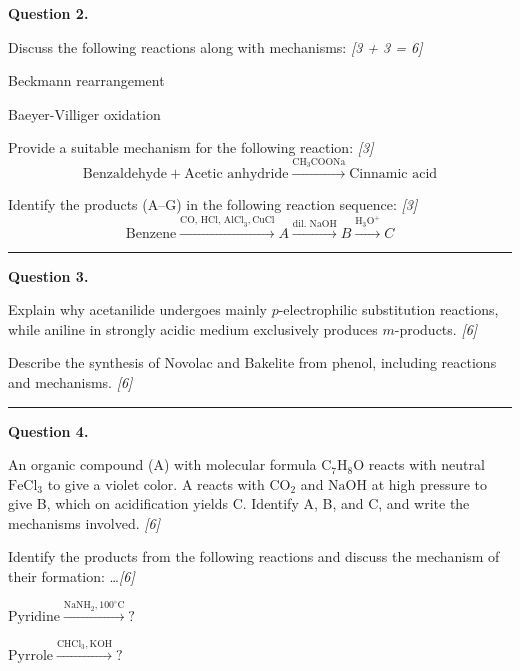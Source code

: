 \documentclass[11pt,a4paper]{article}
\newcommand{\pts}[1]{\hfill   \textit{[#1]}}
\begin{document}
\noindent   \textbf{Question 2.}

\begin{parts}
  \item Discuss the following reactions along with mechanisms: \pts{3 + 3 = 6}
  
\begin{parts}
    \item Beckmann rearrangement
    \item Baeyer-Villiger oxidation
  \end{parts}
  \item Provide a suitable mechanism for the following reaction: \pts{3}
    \[  \text{Benzaldehyde} +  \text{Acetic anhydride} \xrightarrow{ \text{CH}_3 \text{COONa}}  \text{Cinnamic acid} \]
  \item Identify the products (A--G) in the following reaction sequence: \pts{3}
    \[  \text{Benzene} \xrightarrow{ \text{CO, HCl, AlCl}_3,  \text{CuCl}} A \xrightarrow{ \text{dil. NaOH}} B \xrightarrow{ \text{H}_3 \text{O}^+} C \]
\end{parts}

\medskip\rule{\linewidth}{0.2pt}




\noindent   \textbf{Question 3.}

\begin{parts}
  \item Explain why acetanilide undergoes mainly $p$-electrophilic substitution reactions, while aniline in strongly acidic medium exclusively produces $m$-products. \pts{6}
  \item Describe the synthesis of Novolac and Bakelite from phenol, including reactions and mechanisms. \pts{6}
\end{parts}

\medskip\rule{\linewidth}{0.2pt}




\noindent   \textbf{Question 4.}

\begin{parts}
  \item An organic compound (A) with molecular formula $ \text{C}_7 \text{H}_8 \text{O}$ reacts with neutral $ \text{FeCl}_3$ to give a violet color. A reacts with $ \text{CO}_2$ and $ \text{NaOH}$ at high pressure to give B, which on acidification yields C. Identify A, B, and C, and write the mechanisms involved. \pts{6}
  \item Identify the products from the following reactions and discuss the mechanism of their formation: \dots \pts{6}
  
\begin{parts}
    \item $ \text{Pyridine} \xrightarrow{ \text{NaNH}_2, 100^\circ \text{C}} ?$
    \item $ \text{Pyrrole} \xrightarrow{ \text{CHCl}_3,  \text{KOH}} ?$
  \end{parts}
\end{parts}
\end{document}
